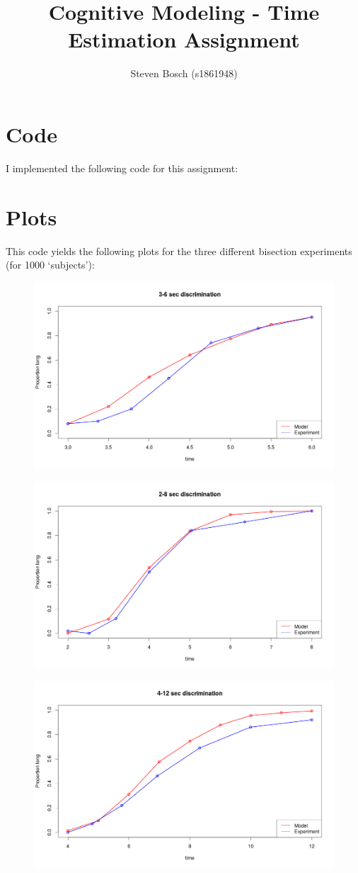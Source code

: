 \documentclass{article}
\title{Cognitive Modeling - Time Estimation Assignment}
\author{Steven Bosch (s1861948)}
\begin{document}
\maketitle

\section{Code}
I implemented the following code for this assignment:


\section{Plots}
This code yields the following plots for the three different bisection experiments (for 1000 `subjects'):

\begin{figure}[H]
\centering
\includegraphics[width=\textwidth]{3-6.png}
\end{figure}
\begin{figure}[H]
\centering
\includegraphics[width=\textwidth]{2-8.png}
\end{figure}
\begin{figure}[H]
\centering
\includegraphics[width=\textwidth]{4-12.png}
\end{figure}
\end{document}
